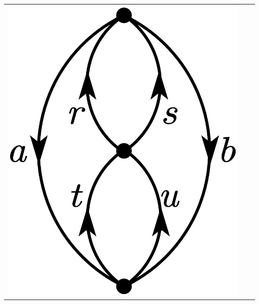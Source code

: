 \documentclass[a4paper]{book}
\newcounter{solution}[chapter]
\begin{document}
\begin{solution}
\begin{center}
\begin{tabular}{ccc}
		\begin{minipage}{0.22\linewidth}
		\centering
		\includegraphics[scale=1.0,trim=0 -4 0 -4]{./pictures/6.12/hugenholtz_2.png}
		\end{minipage} &
		

\end{tabular}
\end{center}
\end{solution}
\end{document}
